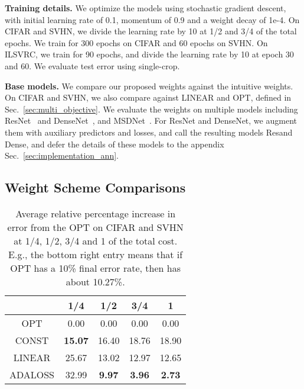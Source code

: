 \textbf{Training details.} We optimize the models using stochastic gradient descent, with initial learning rate of 0.1, momentum of 0.9 and a weight decay of 1e-4. On CIFAR and SVHN, we divide the learning rate by 10 at 1/2 and 3/4 of the total epochs. We train for 300 epochs on CIFAR and 60 epochs on SVHN.  On ILSVRC, we train for 90 epochs, and divide the learning rate by 10 at epoch 30 and 60. We evaluate test error using single-crop.


\textbf{Base models.} We compare our proposed \adaloss weights against the intuitive \const weights. On CIFAR and SVHN, we also compare \adaloss against LINEAR and OPT, defined in Sec.~\ref{sec:multi_objective}. 
We evaluate the weights on multiple models including ResNet~\cite{resnet} and DenseNet~\cite{densenet}, and MSDNet~\cite{msdense}. For ResNet and DenseNet, we augment them with auxiliary predictors and losses, and call the resulting models Res\ann and Dense\ann, and defer the details of these models to the appendix Sec.~\ref{sec:implementation_ann}.


\subsection{Weight Scheme Comparisons}
\label{sec:compare_opt}


\begin{table}
    \centering
    \begin{tabular}{c|cccc}
    \hline
     & 1/4 & 1/2 & 3/4 & 1 \\
    \hline
    OPT
	&  0.00 &  0.00 &  0.00 &  0.00 \\
    CONST
	& \textbf{15.07} & 16.40 & 18.76 & 18.90 \\
    LINEAR
	& 25.67 & 13.02 & 12.97 & 12.65 \\
    ADALOSS
 & 32.99 &  \textbf{9.97} &  \textbf{3.96} &  \textbf{2.73} \\
    \hline
    \end{tabular}
        
    \caption{Average relative percentage increase in error from the OPT on CIFAR and SVHN at 1/4, 1/2, 3/4 and 1 of the total cost. E.g., the bottom right entry means that if OPT has a 10\% final error rate, then \adaloss has about 10.27\%.}
    \label{tab:compare_f}
\end{table}

